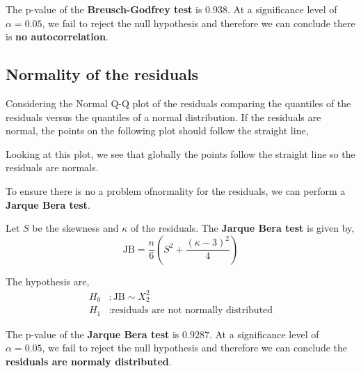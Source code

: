 
The p-value of the \textbf{Breusch-Godfrey test} is $0.938$. At a significance level of $\alpha = 0.05$, we fail to reject the null hypothesis and therefore we can conclude there is \textbf{no autocorrelation}. 

\subsection{Normality of the residuals}

Considering the Normal Q-Q plot of the residuals comparing the quantiles of the residuals versus the quantiles of a normal distribution. If the residuals are normal, the points on the following plot should follow the straight line,


Looking at this plot, we see that globally the points follow the straight line so the residuals are normals.  

To ensure there is no a problem ofnormality for the residuals, we can perform a \textbf{Jarque Bera test}. 

Let $S$ be the skewness and $\kappa$ of the residuals. The \textbf{Jarque Bera test} is given by, 
\begin{equation}
	\text{JB} = \frac{n}{6} \left(S^2 + \frac{(\kappa - 3)^2}{4} \right)
\end{equation}

The hypothesis are, 
\begin{align*}
	H_0&: \text{JB} \sim X^2_2 \\
	H_1&: \text{residuals are not normally distributed}
\end{align*}


The p-value of the \textbf{Jarque Bera test} is $0.9287$. At a significance level of $\alpha = 0.05$, we fail to reject the null hypothesis and therefore we can conclude the \textbf{residuals are normaly distributed}. 